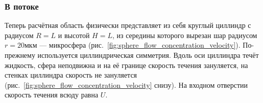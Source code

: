\documentclass[oneside,final,12pt]{extreport}
\begin{document}



\FloatBarrier{}
\subsubsection*{В потоке}

Теперь расчётная область физически представляет из себя круглый циллиндр
с радиусом $R = L$ и высотой $H = L$,
из середины которого вырезан шар радиусом $r = 20\text{мкм}$ --- микросфера
(рис.~\ref{fig:sphere_flow_concentration_velocity}).
По-прежнему используется циллиндрическая симметрия.
Вдоль оси циллиндра течёт жидкость,
сфера неподвижна и на её границе скорость течения зануляется,
на стенках циллиндра скорость не зануляется
(рис.~\ref{fig:sphere_flow_concentration_velocity} снизу).
На входном отверстии скорость течения всюду равна $U$.
\end{document}
